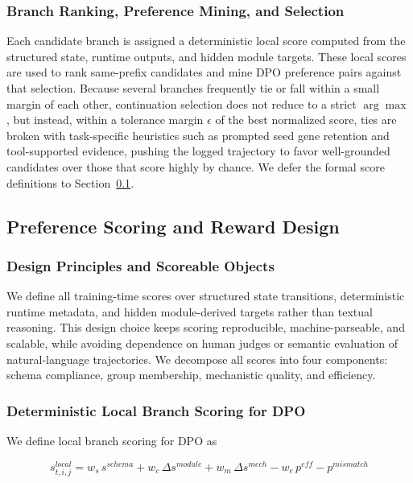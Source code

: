 \documentclass[thesis,letterpaper,12pt]{utthesis}
\begin{document}
\subsubsection{Branch Ranking, Preference Mining, and Selection}\label{sec:branch-ranking}
Each candidate branch is assigned a deterministic local score computed from the structured state, runtime outputs, and hidden module targets. These local scores are used to rank same-prefix candidates and mine DPO preference pairs against that selection. Because several branches frequently tie or fall within a small margin of each other, continuation selection does not reduce to a strict $\arg\max$, but instead, within a tolerance margin $\epsilon$ of the best normalized score, ties are broken with task-specific heuristics such as prompted seed gene retention and tool-supported evidence, pushing the logged trajectory to favor well-grounded candidates over those that score highly by chance. We defer the formal score definitions to Section~\ref{sec:rewards}.

\subsection{Preference Scoring and Reward Design}\label{sec:rewards}
\subsubsection{Design Principles and Scoreable Objects}
We define all training-time scores over structured state transitions, deterministic runtime metadata, and hidden module-derived targets rather than textual reasoning. This design choice keeps scoring reproducible, machine-parseable, and scalable, while avoiding dependence on human judges or semantic evaluation of natural-language trajectories. We decompose all scores into four components: schema compliance, group membership, mechanistic quality, and efficiency. 

\subsubsection{Deterministic Local Branch Scoring for DPO}
We define local branch scoring for DPO as 

\begin{equation}\label{eqn:local-reward}
    s^{local}_{t,i,j} = w_s\, s^{schema} + w_c\, \Delta s^{module} + w_m\, \Delta s^{mech} - w_e\, p^{eff} - p^{mismatch}
\end{equation}
\end{document}
